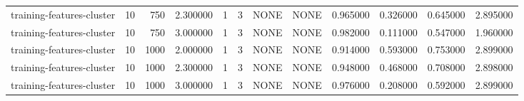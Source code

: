 \begin{tabular}{lrrrllllrrrr}
training-features-cluster & 10 & 750 & 2.300000 & 1 & 3 & NONE & NONE & 0.965000 & 0.326000 & 0.645000 & 2.895000 \\
training-features-cluster & 10 & 750 & 3.000000 & 1 & 3 & NONE & NONE & 0.982000 & 0.111000 & 0.547000 & 1.960000 \\
training-features-cluster & 10 & 1000 & 2.000000 & 1 & 3 & NONE & NONE & 0.914000 & 0.593000 & 0.753000 & 2.899000 \\
training-features-cluster & 10 & 1000 & 2.300000 & 1 & 3 & NONE & NONE & 0.948000 & 0.468000 & 0.708000 & 2.898000 \\
training-features-cluster & 10 & 1000 & 3.000000 & 1 & 3 & NONE & NONE & 0.976000 & 0.208000 & 0.592000 & 2.899000 \\
\bottomrule
\end{tabular}

